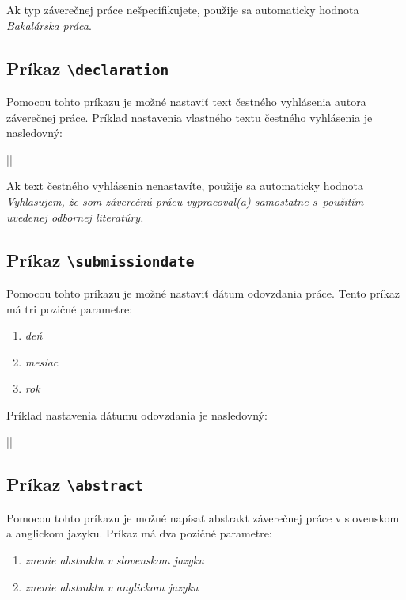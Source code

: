 Ak typ záverečnej práce nešpecifikujete, použije sa automaticky hodnota {\it Bakalárska práca}.


\subsection{Príkaz {\tt \textbackslash{}declaration}}

Pomocou tohto príkazu je možné nastaviť text čestného vyhlásenia autora záverečnej práce. Príklad nastavenia vlastného textu čestného vyhlásenia je nasledovný:

||

Ak text čestného vyhlásenia nenastavíte, použije sa automaticky hodnota {\it Vyhlasujem, že som záverečnú prácu vypracoval(a) samostatne s~použitím uvedenej odbornej literatúry.}


\subsection{Príkaz {\tt \textbackslash{}submissiondate}}

Pomocou tohto príkazu je možné nastaviť dátum odovzdania práce. Tento príkaz má tri pozičné parametre:

\begin{enumerate}
    \item {\it deň}
    \item {\it mesiac}
    \item {\it rok}
\end{enumerate}

Príklad nastavenia dátumu odovzdania je nasledovný:

||


\subsection{Príkaz {\tt \textbackslash{}abstract}}

Pomocou tohto príkazu je možné napísať abstrakt záverečnej práce v slovenskom a anglickom jazyku. Príkaz má dva pozičné parametre:

\begin{enumerate}
    \item {\it znenie abstraktu v slovenskom jazyku}
    \item {\it znenie abstraktu v anglickom jazyku}
\end{enumerate}

